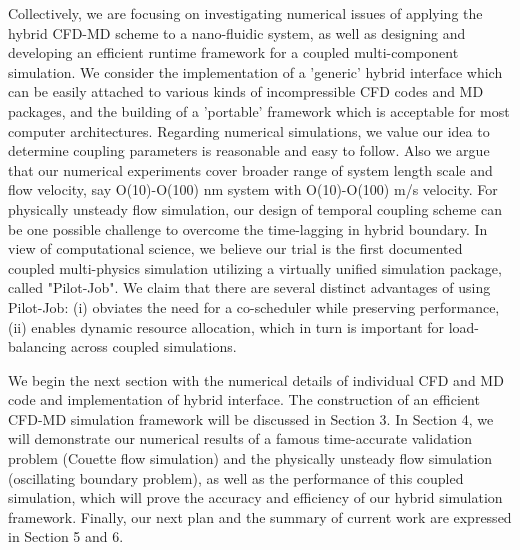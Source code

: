 \documentclass[preprint,12pt]{elsarticle}
\begin{document}
Collectively, we are focusing on investigating numerical issues of applying the hybrid CFD-MD scheme to a nano-fluidic system, as well as designing and developing an efficient runtime framework for a coupled multi-component simulation. 
We consider the implementation of a 'generic' hybrid interface which can be easily attached to various kinds of incompressible CFD codes and MD packages, and the building of a 'portable' framework which is acceptable for most computer architectures. Regarding numerical simulations, we value our idea to determine coupling parameters is reasonable and easy to follow. Also we argue that our numerical experiments cover broader range of system length scale and flow velocity, say O(10)-O(100) nm system with O(10)-O(100) m/s velocity. For physically unsteady flow simulation, our design of temporal coupling scheme can be one possible challenge to overcome the time-lagging in hybrid boundary.
In view of computational science, we believe our trial is the first documented coupled multi-physics simulation utilizing a virtually unified simulation package, called "Pilot-Job". We claim that there are several distinct advantages of using Pilot-Job: (i) obviates the need for a co-scheduler while preserving performance, (ii) enables dynamic resource allocation, which in turn is important for load-balancing across coupled simulations. %

We begin the next section with the numerical details of individual CFD and MD code and implementation of hybrid interface. The construction of an efficient CFD-MD simulation framework will be discussed in Section 3. In Section 4, we will demonstrate our numerical results of a famous time-accurate validation problem (Couette flow simulation) and the physically unsteady flow simulation (oscillating boundary problem), as well as the performance of this coupled simulation, which will prove the accuracy and efficiency of our hybrid simulation framework. Finally, our next plan and the summary of current work are expressed in Section 5 and 6.
\end{document}
